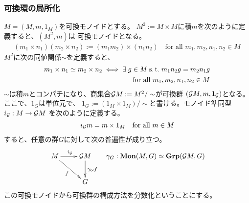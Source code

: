 \subsubsection{可換環の局所化}\label{s3:可換環の局所化} %
	$M=(M,m,1_M)$を可換モノイドとする。
	$M^2:=M\times M$に積$m$を次のように定義すると、$(M^2,m)$は
	可換モノイドとなる。
	\begin{equation*}\begin{split}
		(m_1\times n_1)(m_2\times n_2) := (m_1m_2)\times(n_1n_2)
		\quad\text{for all }m_1,m_2,n_1,n_2\in M
	\end{split}\end{equation*}
	$M^2$に次の同値関係$\sim$を定義すると、
	\begin{equation*}\begin{split}
		m_1\times n_1\simeq m_2\times n_2
		\iff \exists\; g\in M{\;{\operatorname{s.t.}}\;} m_1n_2g = m_2n_1g \\
		\quad\text{for all }m_1,m_2,n_1,n_2\in M
	\end{split}\end{equation*}
	$\sim$は積$m$とコンパチになり、商集合${{\mathcal{G}}} M:= M^2/\sim$が可換群
	$({{\mathcal{G}}} M,m,1_{{\mathcal{G}}})$となる。ここで、$1_G$は単位元で、
	$1_G:=(1_M\times1_M)/\sim$と書ける。モノイド準同型$i_{{\mathcal{G}}}:M\to{\ensuremath{{\mathcal{G}}}} M$
	を次のように定義する。
	\begin{equation*}\begin{split}
		i_{{\mathcal{G}}} m = m\times 1_M \quad\text{for all }m\in M
	\end{split}\end{equation*}
	すると、任意の群$G$に対して次の普遍性が成り立つ。
	\begin{equation*}\begin{split}
		\xymatrix{
			M \ar[rd]_{f} \ar[r]^{i_\G} & \G M \ar[d]^{\gamma_Gf} \\
			& G
		}\quad \gamma_G:\mybf{Mon}(M, G)\simeq \mybf{Grp}(\G M, G)
	\end{split}\end{equation*}
	この可換モノイドから可換群の構成方法を分数化ということにする。

